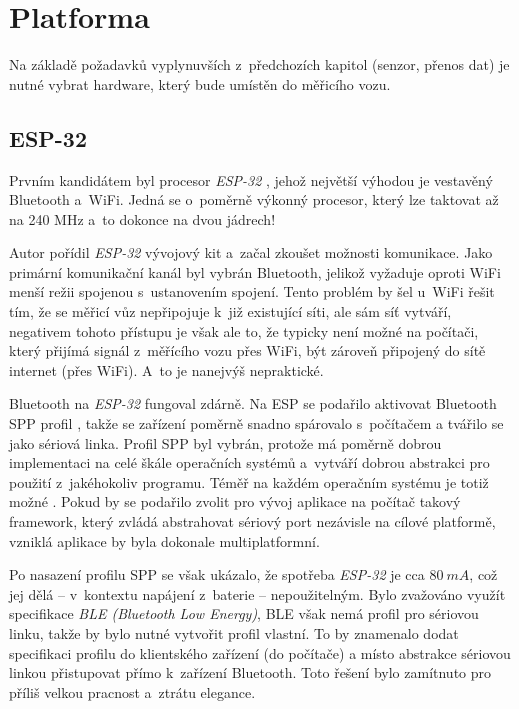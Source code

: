 \section{Platforma}
\label{sec:wsm-platforma}

Na základě požadavků vyplynuvších z~předchozích kapitol (senzor, přenos dat)
je nutné vybrat hardware, který bude umístěn do měřicího vozu.

\subsection{ESP-32}
\label{subsec:wsm-esp32}

Prvním kandidátem byl procesor \textit{ESP-32} \cite{esp-32}, jehož největší
výhodou je vestavěný Bluetooth a~WiFi. Jedná se o~poměrně výkonný procesor,
který lze taktovat až na 240 MHz a~to dokonce na dvou jádrech!
\cite{esp-32:datasheet}

Autor pořídil \textit{ESP-32} vývojový kit a~začal zkoušet možnosti komunikace. Jako
primární komunikační kanál byl vybrán Bluetooth, jelikož vyžaduje oproti WiFi
menší režii spojenou s~ustanovením spojení. Tento problém by šel u~WiFi řešit
tím, že se měřicí vůz nepřipojuje k~již existující síti, ale sám síť vytváří,
negativem tohoto přístupu je však ale to, že typicky není možné na počítači,
který přijímá signál z~měřícího vozu přes WiFi, být zároveň připojený do sítě
internet (přes WiFi). A~to je nanejvýš nepraktické.

Bluetooth na \textit{ESP-32} fungoval zdárně. Na ESP se podařilo aktivovat Bluetooth SPP
profil \cite{spp:specs}, takže se zařízení poměrně snadno spárovalo s~počítačem a
tvářilo se jako sériová linka. Profil SPP byl vybrán, protože má
poměrně dobrou implementaci na celé škále operačních systémů a~vytváří dobrou
abstrakci pro použití z~jakéhokoliv programu. Téměř na každém operačním systému
je totiž možné . Pokud by se podařilo zvolit pro
vývoj aplikace na počítač takový framework, který zvládá abstrahovat sériový
port nezávisle na cílové platformě, vzniklá aplikace by byla dokonale
multiplatformní.

Po nasazení profilu SPP se však ukázalo, že spotřeba \textit{ESP-32} je cca $80\ mA$,
což jej dělá -- v~kontextu napájení z~baterie -- nepoužitelným. Bylo zvažováno
využít specifikace \textit{BLE (Bluetooth Low Energy)}, BLE však nemá
profil pro sériovou linku, takže by bylo nutné vytvořit profil vlastní. To
by znamenalo dodat specifikaci profilu do klientského zařízení (do počítače)
a místo abstrakce sériovou linkou přistupovat přímo k~zařízení Bluetooth.
Toto řešení bylo zamítnuto pro příliš velkou pracnost a~ztrátu elegance.

